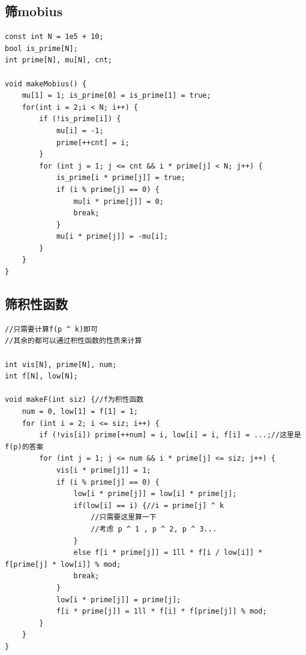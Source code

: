 \documentclass[twoside]{article}
\begin{document}
\subsection{筛mobius}
\begin{lstlisting}
const int N = 1e5 + 10;
bool is_prime[N];
int prime[N], mu[N], cnt;

void makeMobius() {
    mu[1] = 1; is_prime[0] = is_prime[1] = true;
    for(int i = 2;i < N; i++) {
        if (!is_prime[i]) {
            mu[i] = -1;
            prime[++cnt] = i;
        }
        for (int j = 1; j <= cnt && i * prime[j] < N; j++) {
            is_prime[i * prime[j]] = true;
            if (i % prime[j] == 0) {
                mu[i * prime[j]] = 0;
                break;
            }
            mu[i * prime[j]] = -mu[i];
        }
    }
}
\end{lstlisting}
\subsection{筛积性函数}
\begin{lstlisting}
//只需要计算f(p ^ k)即可
//其余的都可以通过积性函数的性质来计算

int vis[N], prime[N], num;
int f[N], low[N];

void makeF(int siz) {//f为积性函数
    num = 0, low[1] = f[1] = 1;
    for (int i = 2; i <= siz; i++) {
        if (!vis[i]) prime[++num] = i, low[i] = i, f[i] = ...;//这里是f(p)的答案
        for (int j = 1; j <= num && i * prime[j] <= siz; j++) {
            vis[i * prime[j]] = 1;
            if (i % prime[j] == 0) {
                low[i * prime[j]] = low[i] * prime[j];
                if(low[i] == i) {//i = prime[j] ^ k
                    //只需要这里算一下
                    //考虑 p ^ 1 , p ^ 2, p ^ 3...
                }
                else f[i * prime[j]] = 1ll * f[i / low[i]] * f[prime[j] * low[i]] % mod;
                break;
            }
            low[i * prime[j]] = prime[j];
            f[i * prime[j]] = 1ll * f[i] * f[prime[j]] % mod;
        }
    }
}

\end{lstlisting}
\end{document}
